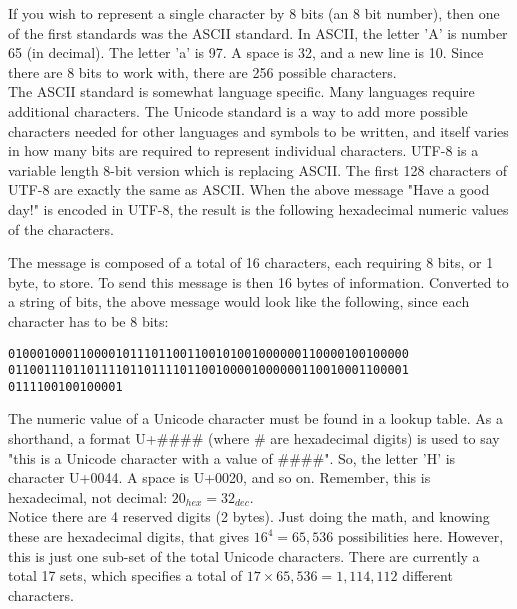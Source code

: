 If you wish to represent a single character by 8 bits (an 8 bit number), then one of the first standards was the ASCII standard. In ASCII, the letter 'A' is number 65 (in decimal). The letter 'a' is 97. A space is 32, and a new line is 10. Since there are 8 bits to work with, there are 256 possible characters.\\

The ASCII standard is somewhat language specific. Many languages require additional characters. The Unicode standard is a way to add more possible characters needed for other languages and symbols to be written, and itself varies in how many bits are required to represent individual characters. UTF-8 is a variable length 8-bit version which is replacing ASCII. The first 128 characters of UTF-8 are exactly the same as ASCII. When the above message "Have a good day!" is encoded in UTF-8, the result is the following hexadecimal numeric values of the characters.\\

\begin{center}\end{center}

The message is composed of a total of 16 characters, each requiring 8 bits, or 1 byte, to store. To send this message is then 16 bytes of information. Converted to a string of bits, the above message would look like the following, since each character has to be 8 bits:\\

\begin{verbatim}
01000100011000010111011001100101001000000110000100100000
01100111011011110110111101100100001000000110010001100001 
0111100100100001
\end{verbatim}

The numeric value of a Unicode character must be found in a lookup table. As a shorthand, a format U+\#\#\#\# (where \# are hexadecimal digits) is used to say "this is a Unicode character with a value of \#\#\#\#". So, the letter 'H' is character U+0044. A space is U+0020, and so on. Remember, this is hexadecimal, not decimal: \(20_{hex} = 32_{dec}\).\\

Notice there are 4 reserved digits (2 bytes). Just doing the math, and knowing these are hexadecimal digits, that gives \(16^4 = 65,536\) possibilities here. However, this is just one sub-set of the total Unicode characters. There are currently a total 17 sets, which specifies a total of \(17 \times 65,536 = 1,114,112\) different characters.\\

